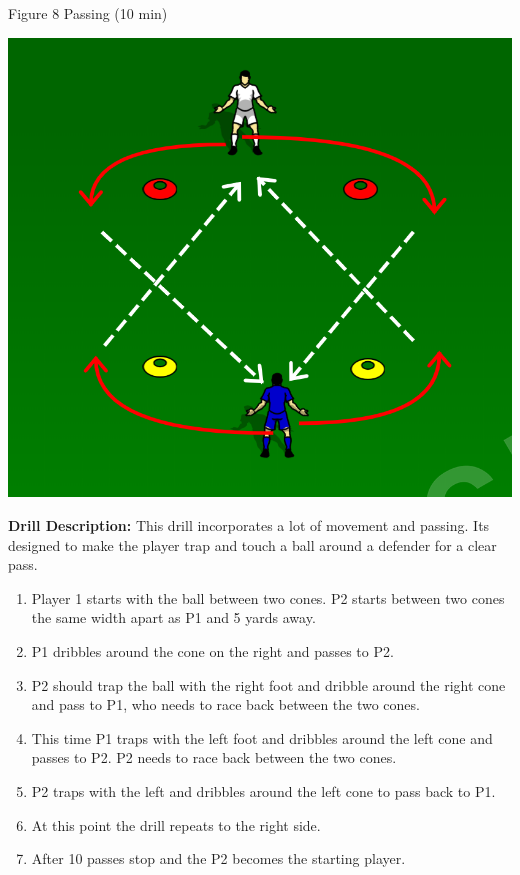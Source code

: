 \begin{evenBlock}{Figure 8 Passing (10 min)}

\begin{minipage}[t]{\linewidth}
    \centering
    
    \begin{minipage}{.3\linewidth} %
        \includegraphics[width=\textwidth]{../img/Trimmed/Figure-8}
    \end{minipage}
    \hspace{0.05\linewidth}
    \begin{minipage}{.6\linewidth} %
        \textbf{Drill Description:}
        This drill incorporates a lot of movement and passing.  Its designed to make the player trap and touch a ball around a defender for a clear pass.
        \begin{enumerate}
            \setlength{\itemsep}{0pt}
            \setlength{\parskip}{0pt}
            \setlength{\parsep}{0pt}
            \item Player 1 starts with the ball between two cones.  P2 starts between two cones the same width apart as P1 and 5 yards away.
            \item P1 dribbles around the cone on the right and passes to P2.
            \item P2 should trap the ball with the right foot and dribble around the right cone and pass to P1, who needs to race back between the two cones.
            \item This time P1 traps with the left foot and dribbles around the left cone and passes to P2.  P2 needs to race back between the two cones.
            \item P2 traps with the left and dribbles around the left cone to pass back to P1.
            \item At this point the drill repeats to the right side.
            \item After 10 passes stop and the P2 becomes the starting player.
        \end{enumerate}
        

\end{minipage}
\end{minipage}
\end{evenBlock}
